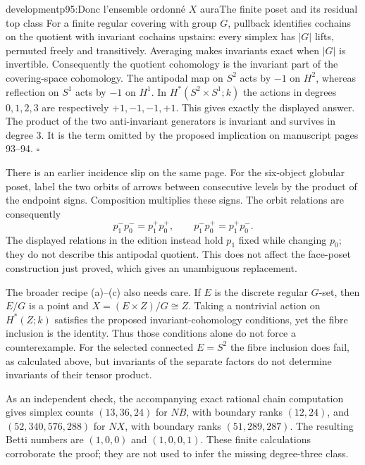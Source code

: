 \begin{dcomment}{development}{p95:Donc l'ensemble ordonné $X$ aura}{The finite poset and its residual top class}
For a finite regular covering with group $G$, pullback identifies cochains on the quotient with invariant cochains upstairs: every simplex has $|G|$ lifts, permuted freely and transitively. Averaging makes invariants exact when $|G|$ is invertible. Consequently the quotient cohomology is the invariant part of the covering-space cohomology. The antipodal map on $S^2$ acts by $-1$ on $H^2$, whereas reflection on $S^1$ acts by $-1$ on $H^1$. In $H^*(S^2\times S^1;k)$ the actions in degrees $0,1,2,3$ are respectively $+1,-1,-1,+1$. This gives exactly the displayed answer. The product of the two anti-invariant generators is invariant and survives in degree $3$. It is the term omitted by the proposed implication on manuscript pages 93--94. \hfill$\square$

There is an earlier incidence slip on the same page. For the six-object globular poset, label the two orbits of arrows between consecutive levels by the product of the endpoint signs. Composition multiplies these signs. The orbit relations are consequently
\[
 p_1^-p_0^-=p_1^+p_0^+,
 \qquad p_1^-p_0^+=p_1^+p_0^-.
\]
The displayed relations in the edition instead hold $p_1$ fixed while changing $p_0$; they do not describe this antipodal quotient. This does not affect the face-poset construction just proved, which gives an unambiguous replacement.

The broader recipe (a)--(c) also needs care. If $E$ is the discrete regular $G$-set, then $E/G$ is a point and $X=(E\times Z)/G\cong Z$. Taking a nontrivial action on $H^*(Z;k)$ satisfies the proposed invariant-cohomology conditions, yet the fibre inclusion is the identity. Thus those conditions alone do not force a counterexample. For the selected connected $E=S^2$ the fibre inclusion does fail, as calculated above, but invariants of the separate factors do not determine invariants of their tensor product.

As an independent check, the accompanying exact rational chain computation gives simplex counts $(13,36,24)$ for $NB$, with boundary ranks $(12,24)$, and $(52,340,576,288)$ for $NX$, with boundary ranks $(51,289,287)$. The resulting Betti numbers are $(1,0,0)$ and $(1,0,0,1)$. These finite calculations corroborate the proof; they are not used to infer the missing degree-three class.
\end{dcomment}

